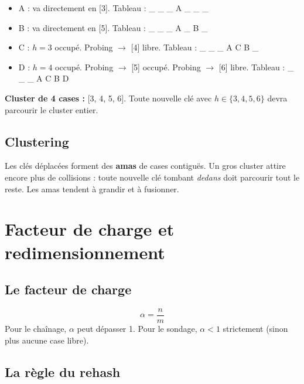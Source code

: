 \documentclass[11pt,a4paper]{article}
\begin{document}
\begin{appliboxR}[Réponse]
\begin{itemize}[nosep]
    \item A : va directement en [3]. Tableau : \_ \_ \_ A \_ \_ \_
    \item B : va directement en [5]. Tableau : \_ \_ \_ A \_ B \_
    \item C : $h=3$ occupé. Probing $\to$ [4] libre. Tableau : \_ \_ \_ A C B \_
    \item D : $h=4$ occupé. Probing $\to$ [5] occupé. Probing $\to$ [6] libre. Tableau : \_ \_ \_ A C B D
\end{itemize}

\medskip
\textbf{Cluster de 4 cases :} [3, 4, 5, 6]. Toute nouvelle clé avec $h \in \{3, 4, 5, 6\}$ devra parcourir le cluster entier.
\end{appliboxR}

\subsection{Clustering}

\begin{attentionbox}
Les clés déplacées forment des \textbf{amas} de cases contiguës. Un gros cluster attire encore plus de collisions : toute nouvelle clé tombant \emph{dedans} doit parcourir tout le reste. Les amas tendent à grandir et à fusionner.
\end{attentionbox}

\section{Facteur de charge et redimensionnement}

\subsection{Le facteur de charge}

\begin{infobox}
\[
\alpha = \frac{n}{m}
\]
Pour le chaînage, $\alpha$ peut dépasser 1. Pour le sondage, $\alpha < 1$ strictement (sinon plus aucune case libre).
\end{infobox}

\subsection{La règle du rehash}
\end{document}
